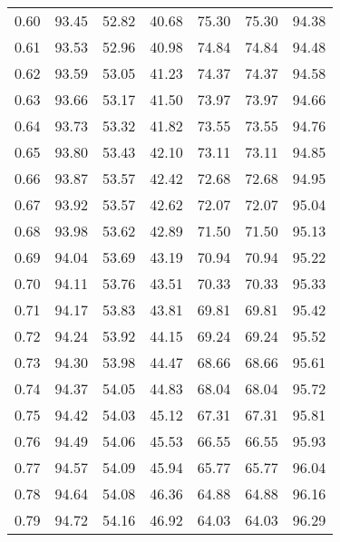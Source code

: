 \begin{tabular}{|c|c|c|c|c|c|c|}
      0.60 &     93.45 &     52.82 &      40.68 &   75.30 &      75.30 &         94.38 \\
      0.61 &     93.53 &     52.96 &      40.98 &   74.84 &      74.84 &         94.48 \\
      0.62 &     93.59 &     53.05 &      41.23 &   74.37 &      74.37 &         94.58 \\
      0.63 &     93.66 &     53.17 &      41.50 &   73.97 &      73.97 &         94.66 \\
      0.64 &     93.73 &     53.32 &      41.82 &   73.55 &      73.55 &         94.76 \\
      0.65 &     93.80 &     53.43 &      42.10 &   73.11 &      73.11 &         94.85 \\
      0.66 &     93.87 &     53.57 &      42.42 &   72.68 &      72.68 &         94.95 \\
      0.67 &     93.92 &     53.57 &      42.62 &   72.07 &      72.07 &         95.04 \\
      0.68 &     93.98 &     53.62 &      42.89 &   71.50 &      71.50 &         95.13 \\
      0.69 &     94.04 &     53.69 &      43.19 &   70.94 &      70.94 &         95.22 \\
      0.70 &     94.11 &     53.76 &      43.51 &   70.33 &      70.33 &         95.33 \\
      0.71 &     94.17 &     53.83 &      43.81 &   69.81 &      69.81 &         95.42 \\
      0.72 &     94.24 &     53.92 &      44.15 &   69.24 &      69.24 &         95.52 \\
      0.73 &     94.30 &     53.98 &      44.47 &   68.66 &      68.66 &         95.61 \\
      0.74 &     94.37 &     54.05 &      44.83 &   68.04 &      68.04 &         95.72 \\
      0.75 &     94.42 &     54.03 &      45.12 &   67.31 &      67.31 &         95.81 \\
      0.76 &     94.49 &     54.06 &      45.53 &   66.55 &      66.55 &         95.93 \\
      0.77 &     94.57 &     54.09 &      45.94 &   65.77 &      65.77 &         96.04 \\
      0.78 &     94.64 &     54.08 &      46.36 &   64.88 &      64.88 &         96.16 \\
      0.79 &     94.72 &     54.16 &      46.92 &   64.03 &      64.03 &         96.29 \\

\end{tabular}
